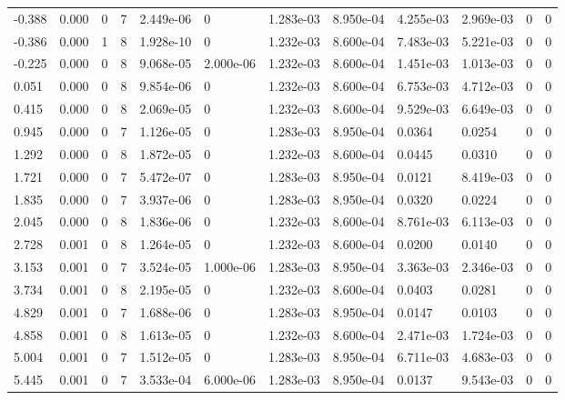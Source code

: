 \documentclass[preview]{standalone}
\begin{document}
{{\begin{tabular}{L{1.2cm}C{1.2cm} C{0.3cm}C{0.5cm} C{1.4cm}C{1.4cm} C{1.4cm}C{1.4cm} C{1.6cm}C{1.6cm} C{1.6cm}C{1.6cm}}
  -0.388  &  0.000  & 0     &  7 &  2.449e-06  & 0  &  1.283e-03&   8.950e-04& 4.255e-03 & 2.969e-03   &  0 & 0  \\ 
  -0.386  &  0.000  & 1     &  8 &  1.928e-10  & 0  &  1.232e-03&   8.600e-04& 7.483e-03 & 5.221e-03   &  0 & 0  \\ 
  -0.225  &  0.000  & 0     &  8 &  9.068e-05  & 2.000e-06  &  1.232e-03&   8.600e-04& 1.451e-03 & 1.013e-03   &  0 & 0  \\ 
  0.051  &  0.000  & 0     &  8 &  9.854e-06  & 0  &  1.232e-03&   8.600e-04& 6.753e-03 & 4.712e-03   &  0 & 0  \\ 
  0.415  &  0.000  & 0     &  8 &  2.069e-05  & 0  &  1.232e-03&   8.600e-04& 9.529e-03 & 6.649e-03   &  0 & 0  \\ 
  0.945  &  0.000  & 0     &  7 &  1.126e-05  & 0  &  1.283e-03&   8.950e-04& 0.0364 & 0.0254   &  0 & 0  \\ 
  1.292  &  0.000  & 0     &  8 &  1.872e-05  & 0  &  1.232e-03&   8.600e-04& 0.0445 & 0.0310   &  0 & 0  \\ 
  1.721  &  0.000  & 0     &  7 &  5.472e-07  & 0  &  1.283e-03&   8.950e-04& 0.0121 & 8.419e-03   &  0 & 0  \\ 
  1.835  &  0.000  & 0     &  7 &  3.937e-06  & 0  &  1.283e-03&   8.950e-04& 0.0320 & 0.0224   &  0 & 0  \\ 
  2.045  &  0.000  & 0     &  8 &  1.836e-06  & 0  &  1.232e-03&   8.600e-04& 8.761e-03 & 6.113e-03   &  0 & 0  \\ 
  2.728  &  0.001  & 0     &  8 &  1.264e-05  & 0  &  1.232e-03&   8.600e-04& 0.0200 & 0.0140   &  0 & 0  \\ 
  3.153  &  0.001  & 0     &  7 &  3.524e-05  & 1.000e-06  &  1.283e-03&   8.950e-04& 3.363e-03 & 2.346e-03   &  0 & 0  \\ 
  3.734  &  0.001  & 0     &  8 &  2.195e-05  & 0  &  1.232e-03&   8.600e-04& 0.0403 & 0.0281   &  0 & 0  \\ 
  4.829  &  0.001  & 0     &  7 &  1.688e-06  & 0  &  1.283e-03&   8.950e-04& 0.0147 & 0.0103   &  0 & 0  \\ 
  4.858  &  0.001  & 0     &  8 &  1.613e-05  & 0  &  1.232e-03&   8.600e-04& 2.471e-03 & 1.724e-03   &  0 & 0  \\ 
  5.004  &  0.001  & 0     &  7 &  1.512e-05  & 0  &  1.283e-03&   8.950e-04& 6.711e-03 & 4.683e-03   &  0 & 0  \\ 
  5.445  &  0.001  & 0     &  7 &  3.533e-04  & 6.000e-06  &  1.283e-03&   8.950e-04& 0.0137 & 9.543e-03   &  0 & 0  \\ 

\end{tabular}}}
\end{document}

